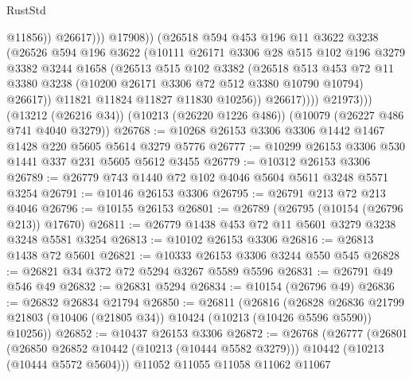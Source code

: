 \begin{lexlean}{RustStd}
\begin{coremodule}
                              @11856))
                          @26617)))
                    @17908))
                (@26518
                  @594
                  @453
                  @196
                  @11
                  @3622
                  @3238
                  (@26526
                    @594
                    @196
                    @3622
                    (@10111
                      @26171
                      @3306
                      @28
                      @515
                      @102
                      @196
                      @3279
                      @3382
                      @3244
                      @1658
                      (@26513
                        @515
                        @102
                        @3382
                        (@26518
                          @513
                          @453
                          @72
                          @11
                          @3380
                          @3238
                          (@10200 @26171 @3306 @72 @512 @3380 @10790 @10794)
                          @26617))
                      @11821
                      @11824
                      @11827
                      @11830
                      @10256))
                  @26617))))
          @21973)))
    (@13212 (@26216 @34))
    (@10213 (@26220 @1226 @486))
    (@10079 (@26227 @486 @741 @4040 @3279))
@26768 := @10268 @26153 @3306 @3306 @1442 @1467 @1428 @220 @5605 @5614 @3279 @5776
@26777 := @10299 @26153 @3306 @530 @1441 @337 @231 @5605 @5612 @3455
@26779 := @10312 @26153 @3306
@26789 := @26779 @743 @1440 @72 @102 @4046 @5604 @5611 @3248 @5571 @3254
@26791 := @10146 @26153 @3306
@26795 := @26791 @213 @72 @213 @4046
@26796 := @10155 @26153
@26801 := @26789 (@26795 (@10154 (@26796 @213)) @17670)
@26811 := @26779 @1438 @453 @72 @11 @5601 @3279 @3238 @3248 @5581 @3254
@26813 := @10102 @26153 @3306
@26816 := @26813 @1438 @72 @5601
@26821 := @10333 @26153 @3306 @3244 @550 @545
@26828 := @26821 @34 @372 @72 @5294 @3267 @5589 @5596
@26831 := @26791 @49 @546 @49
@26832 := @26831 @5294
@26834 := @10154 (@26796 @49)
@26836 := @26832 @26834 @21794
@26850 := @26811
    (@26816
      (@26828
        @26836
        @21799
        @21803
        (@10406 (@21805 @34))
        @10424
        (@10213 (@10426 @5596 @5590))
        @10256))
@26852 := @10437 @26153 @3306
@26872 := @26768
    (@26777
      (@26801
        (@26850 @26852 @10442 (@10213 (@10444 @5582 @3279)))
        @10442
        (@10213 (@10444 @5572 @5604)))
      @11052
      @11055
      @11058
      @11062
      @11067

\end{coremodule}
\end{lexlean}
